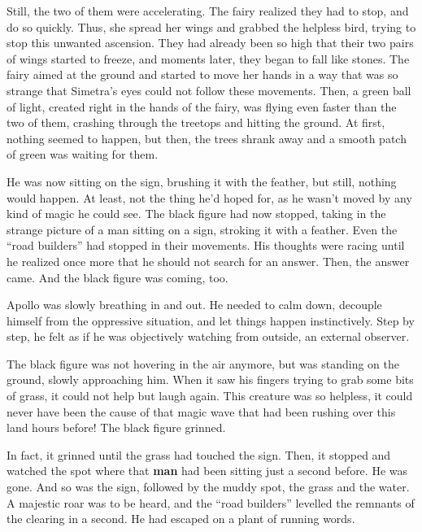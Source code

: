 Still, the two of them were accelerating. The fairy realized they had to stop, and do so quickly. Thus, she spread her wings and grabbed the helpless bird, trying to stop this unwanted ascension. They had already been so high that their two pairs of wings started to freeze, and moments later, they began to fall like stones. The fairy aimed at the ground and started to move her hands in a way that was so strange that Simetra's eyes could not follow these movements. Then, a green ball of light, created right in the hands of the fairy, was flying even faster than the two of them, crashing through the treetops and hitting the ground. At first, nothing seemed to happen, but then, the trees shrank away and a smooth patch of green was waiting for them. 

\fancybreaker{}

He was now sitting on the sign, brushing it with the feather, but still, nothing would happen. At least, not the thing he'd hoped for, as he wasn't moved by any kind of magic he could see. The black figure had now stopped, taking in the strange picture of a man sitting on a sign, stroking it with a feather. Even the \enquote{road builders} had stopped in their movements.
His thoughts were racing until he realized once more that he should not search for an answer. Then, the answer came. And the black figure was coming, too.

Apollo was slowly breathing in and out. He needed to calm down, decouple himself from the oppressive situation, and let things happen instinctively. Step by step, he felt as if he was objectively watching from outside, an external observer.

\fancybreaker{}

The black figure was not hovering in the air anymore, but was standing on the ground, slowly approaching him. When it saw his fingers trying to grab some bits of grass, it could not help but laugh again. This creature was so helpless, it could never have been the cause of that magic wave that had been rushing over this land hours before! 
The black figure grinned.

In fact, it grinned until the grass had touched the sign. Then, it stopped and watched the spot where that \textbf{man} had been sitting just a second before. 
He was gone. 
And so was the sign, followed by the muddy spot, the grass and the water. A majestic roar was to be heard, and the \enquote{road builders} levelled the remnants of the clearing in a second.
He had escaped on a plant of running words.
